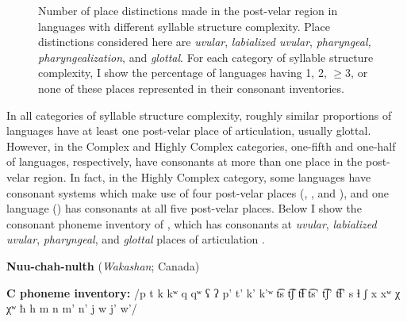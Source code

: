\begin{figure}
\caption{\label{fig:4.11} Number of place distinctions made in the post-velar region in languages with different syllable structure complexity. Place distinctions considered here are \textit{uvular}, \textit{labialized uvular}, \textit{pharyngeal, pharyngealization}, and \textit{glottal}. For each category of syllable structure complexity, I show the percentage of languages having 1, 2, ${\geq}$3, or none of these places represented in their consonant inventories.}
\end{figure}

  In all categories of syllable structure complexity, roughly similar proportions of languages have at least one post-velar place of articulation, usually glottal. However, in the Complex and Highly Complex categories, one-fifth and one-half of languages, respectively, have consonants at more than one place in the post-velar region. In fact, in the Highly Complex category, some languages have consonant systems which make use of four post-velar places (, , and ), and one language () has consonants at all five post-velar places. Below I show the consonant phoneme inventory of , which has consonants at \textit{uvular}, \textit{labialized uvular}, \textit{pharyngeal}, and \textit{glottal} places of articulation .

\ea\label{ex:4.33}
  \textbf{Nuu-chah-nulth} (\textit{Wakashan}; Canada)

\textbf{C phoneme inventory:} /p t k kʷ q qʷ ʕ ʔ p’ t’ k’ k’ʷ t͡s t͡ʃ t͡ɬ t͡s’ t͡ʃ’ t͡ɬ’ s ɬ ʃ x xʷ χ χʷ ħ h m n m’ n’ j w j’ w’/
\z

